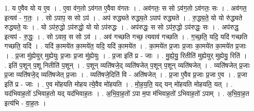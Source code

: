 \documentclass[17pt]{extarticle}
\begin{document}
1. य ए॒वैव यो य ए॒व । . ए॒वा व॑ग॒तो ऽव॑गत ए॒वैवा व॑गतः । . अव॑गतः॒ स सो ऽव॑ग॒तो ऽव॑गतः॒ सः । . अव॑गत॒ इत्यव॑ - ग॒तः॒ । . सो ऽपाप॒ स सो ऽप॑ । . अप॑ रुद्ध्यते रुद्ध्य॒ते ऽपाप॑ रुद्ध्यते । . रु॒द्ध्य॒ते॒ यो यो रु॑द्ध्यते रुद्ध्यते॒ यः । . यो ऽप॑रु॒द्धो ऽप॑रुद्धो॒ यो यो ऽप॑रुद्धः । . अप॑रुद्धः॒ स सो ऽप॑रु॒द्धो ऽप॑रुद्धः॒ सः । . अप॑रुद्ध॒ इत्यप॑ - रु॒द्धः॒ । . सो ऽवाव॒ स सो ऽव॑ । . अव॑ गच्छति गच्छ॒ त्यवाव॑ गच्छति । . ग॒च्छ॒ति॒ यदि॒ यदि॑ गच्छति गच्छति॒ यदि॑ । . यदि॑ का॒मये॑त का॒मये॑त॒ यदि॒ यदि॑ का॒मये॑त । . का॒मये॑त प्र॒जाः प्र॒जाः का॒मये॑त का॒मये॑त प्र॒जाः । . प्र॒जा मु॑ह्येयुर् मुह्येयुः प्र॒जाः प्र॒जा मु॑ह्येयुः । . प्र॒जा इति॑ प्र - जाः । . मु॒ह्ये॒यु॒ रितीति॑ मुह्येयुर् मुह्येयु॒ रिति॑ । . इति॑ प॒शून् प॒शू नितीति॑ प॒शून् । . प॒शून् व्यति॑षजे॒द् व्यति॑षजेत् प॒शून् प॒शून् व्यति॑षजेत् । . व्यति॑षजेत् प्र॒जाः प्र॒जा व्यति॑षजे॒द् व्यति॑षजेत् प्र॒जाः । . व्यति॑षजे॒दिति॑ वि - अति॑षजेत् । . प्र॒जा ए॒वैव प्र॒जाः प्र॒जा ए॒व । . प्र॒जा इति॑ प्र - जाः । . ए॒व मो॑हयति मोहय त्ये॒वैव मो॑हयति । . मो॒ह॒य॒ति॒ यद् यन् मो॑हयति मोहयति॒ यत् । . यद॑भिवाह॒तो॑ ऽभिवाह॒तो यद् यद॑भिवाह॒तः । . अ॒भि॒वा॒ह॒तो॑ ऽपा म॒पा म॑भिवाह॒तो॑ ऽभिवाह॒तो॑ ऽपाम् । . अ॒भि॒वा॒ह॒त इत्य॑भि - वा॒ह॒तः । \newline
\end{document}
